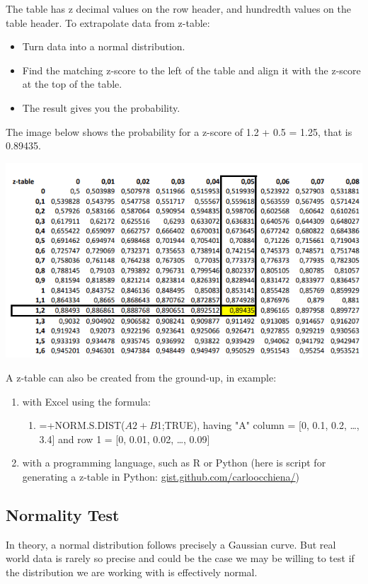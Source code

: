 \documentclass{article}
\begin{document}
The table has z decimal values on the row header, and hundredth values on the table header. 
To extrapolate data from z-table:
\begin{itemize}
    \item Turn data into a normal distribution.
    \item Find the matching z-score to the left of the table and align it with the z-score at the top of the table.
    \item The result gives you the probability. 
\end{itemize}

The image below shows the probability for a z-score of 1.2 + 0.5 = 1.25, that is 0.89435.

\includegraphics{z-table}

A z-table can also be created from the ground-up, in example: 
\begin{enumerate}
    \item with Excel using the formula:
    \begin{enumerate}
        \item =+NORM.S.DIST($A2+B$1;TRUE), having "A" column = [0, 0.1, 0.2, …, 3.4] and row 1 = [0, 0.01, 0.02, …, 0.09]
    \end{enumerate}
    \item with a programming language, such as R or Python (here is script for generating a z-table in Python: \href{https://gist.github.com/carloocchiena/f65e1381a30004352561a606ee0ba51a}{gist.github.com/carloocchiena/})
\end{enumerate}

\subsection{Normality Test}
In theory, a normal distribution follows precisely a Gaussian curve. But real world data is rarely so precise and could be the case we may be willing to test if the distribution we are working with is effectively normal.
\end{document}
